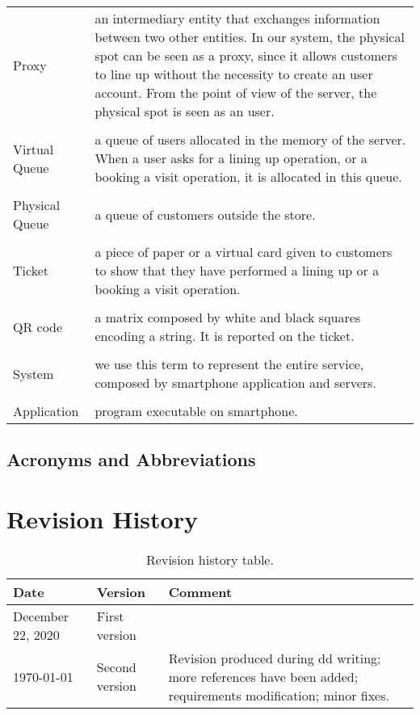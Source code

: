 \begin{tabularx}{\textwidth}{ >{\hsize=0.2\textwidth}X >{\hsize=0.8\textwidth}X}
    Proxy          & an intermediary entity that exchanges information between two other entities. In our system, the physical spot can be seen as a proxy, since it allows customers to line up without the necessity to create an user account. From the point of view of the server, the physical spot is seen as an user. \\ \\
    Virtual Queue & a queue of users allocated in the memory of the server. When a user asks for a lining up operation, or a booking a visit operation, it is allocated in this queue.\\ \\
    Physical Queue & a queue of customers outside the store.\\ \\
    Ticket & a piece of paper or a virtual card given to customers to show that they have performed a lining up or a booking a visit operation.\\ \\
    QR code & a matrix composed by white and black squares encoding a string. It is reported on the ticket.         \\ \\
    System & we use this term to represent the entire service, composed by smartphone application and servers.\\ \\
    Application & program executable on smartphone.
\end{tabularx}

\subsection{Acronyms and Abbreviations}
\printglossary


\section{Revision History}

\begin{table}[H]
    \centering
    \begin{tabular}{ m{} | m{} | m{} }
        \textbf{Date}     & \textbf{Version}	& \textbf{Comment}\\
        \hline
        December 22, 2020 & First version		&          \\
        \hline
        \today            & Second version		& Revision produced during \gls{dd} writing; more references have been added; requirements modification; minor fixes.
    \end{tabular}
    \caption{Revision history table.}
    \label{table:revisionHistory}
\end{table}


